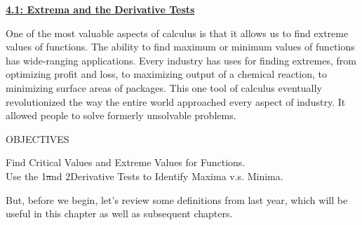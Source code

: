 \textbf{\underline{\large{4.1: Extrema and the Derivative Tests}}} \par

One of the most valuable aspects of calculus is that it allows us to find extreme values of functions. The ability to find maximum or minimum values of functions has wide-ranging applications. Every industry has uses for finding extremes, from optimizing profit and loss, to maximizing output of a chemical reaction, to minimizing surface areas of packages. This one tool of calculus eventually revolutionized the way the entire world approached every aspect of industry. It allowed people to solve formerly unsolvable problems. \par

\begin{tcolorbox}[objective]
    \begin{center}
        OBJECTIVES \\[11pt]
    \end{center}
    Find Critical Values and Extreme Values for Functions. \\
    Use the 1\st and 2\nd Derivative Tests to Identify Maxima v.s. Minima.
\end{tcolorbox}

But, before we begin, let's review some definitions from last year, which will be useful in this chapter as well as subsequent chapters. \par


